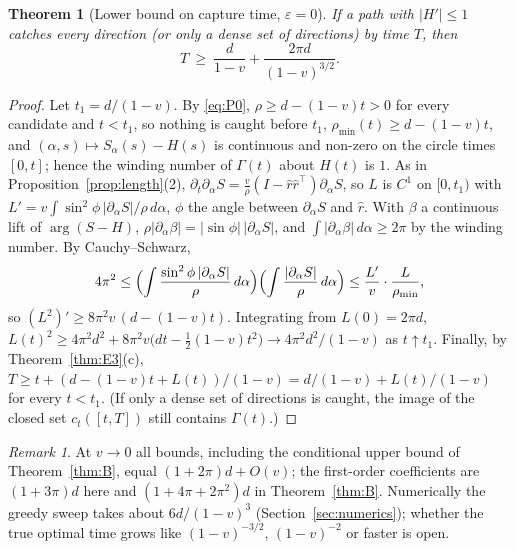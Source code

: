 \documentclass[11pt]{article}
\newtheorem{theorem}{Theorem}
\theoremstyle{remark}\newtheorem{remark}{Remark}
\newcommand{\rhat}{\hat r}
\begin{document}
\begin{theorem}[Lower bound on capture time, $\varepsilon=0$]\label{thm:E5}
If a path with $|H'|\le1$ catches every direction (or only a dense set of directions) by time $T$, then
\[
T\ \ge\ \frac{d}{1-v}+\frac{2\pi d}{(1-v)^{3/2}} .
\]
\end{theorem}
\begin{proof}
Let $t_1=d/(1-v)$. By \eqref{eq:P0}, $\rho\ge d-(1-v)t>0$ for every candidate and $t<t_1$, so nothing is caught before $t_1$,
$\rho_{\min}(t)\ge d-(1-v)t$, and $(\alpha,s)\mapsto S_\alpha(s)-H(s)$ is continuous and non-zero on the circle times $[0,t]$; hence the
winding number of $\Gamma(t)$ about $H(t)$ is $1$. As in Proposition~\ref{prop:length}(2), $\partial_t\partial_\alpha S=
\frac{v}{\rho}(I-\rhat\rhat^{\!\top})\partial_\alpha S$, so $L$ is $C^1$ on $[0,t_1)$ with $L'=v\int\sin^2\!\phi\,|\partial_\alpha S|/\rho\,d\alpha$,
$\phi$ the angle between $\partial_\alpha S$ and $\rhat$. With $\beta$ a continuous lift of $\arg(S-H)$, $\rho|\partial_\alpha\beta|=|\sin\phi|\,|\partial_\alpha S|$,
and $\int|\partial_\alpha\beta|\,d\alpha\ge2\pi$ by the winding number. By Cauchy--Schwarz,
\[
4\pi^2\le\Bigl(\int\frac{\sin^2\phi\,|\partial_\alpha S|}{\rho}\,d\alpha\Bigr)\Bigl(\int\frac{|\partial_\alpha S|}{\rho}\,d\alpha\Bigr)
\le\frac{L'}{v}\cdot\frac{L}{\rho_{\min}},
\]
so $(L^2)'\ge8\pi^2v\,(d-(1-v)t)$. Integrating from $L(0)=2\pi d$,
$L(t)^2\ge4\pi^2d^2+8\pi^2v\bigl(dt-\tfrac12(1-v)t^2\bigr)\to4\pi^2d^2/(1-v)$ as $t\uparrow t_1$. Finally, by
Theorem~\ref{thm:E3}(c), $T\ge t+(d-(1-v)t+L(t))/(1-v)=d/(1-v)+L(t)/(1-v)$ for every $t<t_1$. (If only a dense set of directions is
caught, the image of the closed set $c_t([t,T])$ still contains $\Gamma(t)$.)
\end{proof}
\begin{remark}
At $v\to0$ all bounds, including the conditional upper bound of Theorem~\ref{thm:B}, equal $(1+2\pi)d+O(v)$; the first-order
coefficients are $(1+3\pi)d$ here and $(1+4\pi+2\pi^2)d$ in Theorem~\ref{thm:B}. Numerically the greedy sweep takes about
$6d/(1-v)^3$ (Section~\ref{sec:numerics}); whether the true optimal time grows like $(1-v)^{-3/2}$, $(1-v)^{-2}$ or faster is open.
\end{remark}
\end{document}
